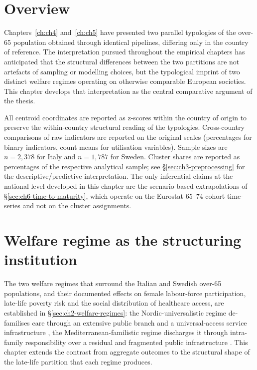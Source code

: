 \label{ch:ch6}

\section{Overview}
\label{sec:ch6-overview}

Chapters~\ref{ch:ch4} and~\ref{ch:ch5} have presented two parallel typologies of the over-65 population obtained through identical pipelines, differing only in the country of reference. The interpretation pursued throughout the empirical chapters has anticipated that the structural differences between the two partitions are not artefacts of sampling or modelling choices, but the typological imprint of two distinct welfare regimes operating on otherwise comparable European societies. This chapter develops that interpretation as the central comparative argument of the thesis.

All centroid coordinates are reported as z-scores within the country of origin to preserve the within-country structural reading of the typologies. Cross-country comparisons of raw indicators are reported on the original scales (percentages for binary indicators, count means for utilisation variables). Sample sizes are $n = 2{,}378$ for Italy and $n = 1{,}787$ for Sweden. Cluster shares are reported as percentages of the respective analytical sample; see \S\ref{sec:ch3-preprocessing} for the descriptive/predictive interpretation. The only inferential claims at the national level developed in this chapter are the scenario-based extrapolations of \S\ref{sec:ch6-time-to-maturity}, which operate on the Eurostat 65--74 cohort time-series and not on the cluster assignments.

\section{Welfare regime as the structuring institution}
\label{sec:ch6-welfare-regime}

The two welfare regimes that surround the Italian and Swedish over-65 populations, and their documented effects on female labour-force participation, late-life poverty risk and the social distribution of healthcare access, are established in \S\ref{sec:ch2-welfare-regimes}: the Nordic-universalistic regime de-familises care through an extensive public branch and a universal-access service infrastructure \citep{anttonen1996}, the Mediterranean-familistic regime discharges it through intra-family responsibility over a residual and fragmented public infrastructure \citep{ferrera1996}. This chapter extends the contrast from aggregate outcomes to the structural shape of the late-life partition that each regime produces.

